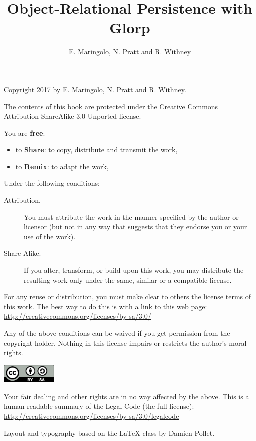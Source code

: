 \documentclass[10pt,twoside,english]{_support/latex/sbabook/sbabook}
\title{Object-Relational Persistence with Glorp}
\author{E. Maringolo, N. Pratt and R. Withney}
\begin{document}
\maketitle
\pagestyle{titlingpage}
\thispagestyle{titlingpage} %

\cleartoverso
{\small

  Copyright 2017 by E. Maringolo, N. Pratt and R. Withney.

  The contents of this book are protected under the Creative Commons
  Attribution-ShareAlike 3.0 Unported license.

  You are \textbf{free}:
  \begin{itemize}
  \item to \textbf{Share}: to copy, distribute and transmit the work,
  \item to \textbf{Remix}: to adapt the work,
  \end{itemize}

  Under the following conditions:
  \begin{description}
  \item[Attribution.] You must attribute the work in the manner specified by the
    author or licensor (but not in any way that suggests that they endorse you
    or your use of the work).
  \item[Share Alike.] If you alter, transform, or build upon this work, you may
    distribute the resulting work only under the same, similar or a compatible
    license.
  \end{description}

  For any reuse or distribution, you must make clear to others the
  license terms of this work. The best way to do this is with a link to
  this web page: \\
  \url{http://creativecommons.org/licenses/by-sa/3.0/}

  Any of the above conditions can be waived if you get permission from
  the copyright holder. Nothing in this license impairs or restricts the
  author's moral rights.

  \begin{center}
    \includegraphics[width=0.2\textwidth]{_support/latex/sbabook/CreativeCommons-BY-SA.pdf}
  \end{center}

  Your fair dealing and other rights are in no way affected by the
  above. This is a human-readable summary of the Legal Code (the full
  license): \\
  \url{http://creativecommons.org/licenses/by-sa/3.0/legalcode}

  \vfill

  Layout and typography based on the  \LaTeX{} class by Damien
  Pollet.
}
\end{document}
